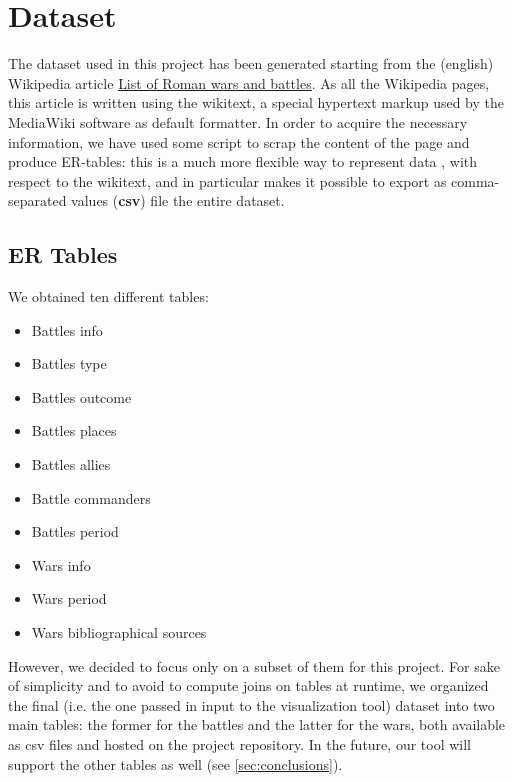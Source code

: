\section{Dataset}\label{sec:dataset}

The dataset used in this project has been generated starting from the (english) Wikipedia article \href{https://en.wikipedia.org/w/index.php?title=List_of_Roman_wars_and_battles}{List of Roman wars and battles}. As all the Wikipedia pages, this article is written using the wikitext, a special hypertext markup used by the MediaWiki software as default formatter. In order to acquire the necessary information, we have used some script to scrap the content of the page and produce ER-tables: this is a much more flexible way to represent data \cite{Chen76}, with respect to the wikitext, and in particular makes it possible to export as comma-separated values (\textbf{csv}) file the entire dataset.

\subsection{ER Tables}
We obtained ten different tables:
\begin{itemize}
    \item Battles info
    \item Battles type
    \item Battles outcome
    \item Battles places
    \item Battles allies
    \item Battle commanders
    \item Battles period
    \item Wars info
    \item Wars period
    \item Wars bibliographical sources
\end{itemize}

However, we decided to focus only on a subset of them for this project.
For sake of simplicity and to avoid to compute joins on tables at runtime, we organized the final (i.e. the one passed in input to the visualization tool) dataset into two main tables: the former for the battles and the latter for the wars, both available as csv files and hosted on the project repository.
In the future, our tool will support the other tables as well (see \ref{sec:conclusions}).

